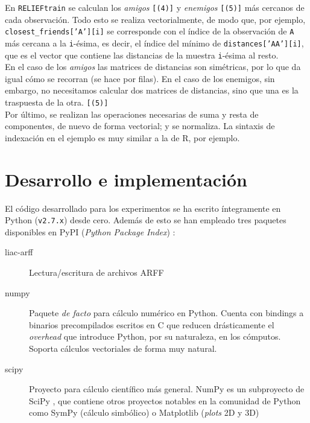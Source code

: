 \documentclass[11pt]{article}
\theoremstyle{plain}
\theoremstyle{definition}
\begin{document}
En \texttt{RELIEFtrain} se calculan los \textit{amigos} \texttt{[(4)]} y \textit{enemigos} \texttt{[(5)]} más cercanos de cada observación. Todo esto se realiza vectorialmente, de modo que, por ejemplo, \texttt{closest\_friends['A'][i]} se corresponde con el índice de la observación de \texttt{A} más cercana a la \texttt{i}-ésima, es decir, el índice del mínimo de \texttt{distances['AA'][i]}, que es el vector que contiene las distancias de la muestra \texttt{i}-ésima al resto. \\

En el caso de los \textit{amigos} las matrices de distancias son simétricas, por lo que da igual cómo se recorran (se hace por filas). En el caso de los enemigos, sin embargo, no necesitamos calcular dos matrices de distancias, sino que una es la traspuesta de la otra. \texttt{[(5)]} \\

Por último, se realizan las operaciones necesarias de suma y resta de
componentes, de nuevo de forma vectorial; y se normaliza. La sintaxis
de indexación en el ejemplo es muy similar a la de R, por ejemplo. \\

\section{Desarrollo e implementación}

El código desarrollado para los experimentos se ha escrito íntegramente en Python (\texttt{v2.7.x}) desde cero. Además de esto se han empleado tres paquetes disponibles en PyPI (\textit{Python Package Index}) \cite{pypi}:

\begin{description}
\item[liac-arff] Lectura/escritura de archivos ARFF \cite{arff}
\item[numpy] Paquete \textit{de facto} para cálculo numérico en Python. Cuenta con bindings a binarios precompilados escritos en C que reducen drásticamente el \textit{overhead} que introduce Python, por su naturaleza, en los cómputos. Soporta cálculos vectoriales de forma muy natural. \cite{numpy}
\item[scipy] Proyecto para cálculo científico más general. NumPy es un subproyecto de SciPy \cite{scipy}, que contiene otros proyectos notables en la comunidad de Python como SymPy \cite{sympy} (cálculo simbólico) o Matplotlib \cite{matplotlib} (\textit{plots} 2D y 3D)
\end{description}
\end{document}
